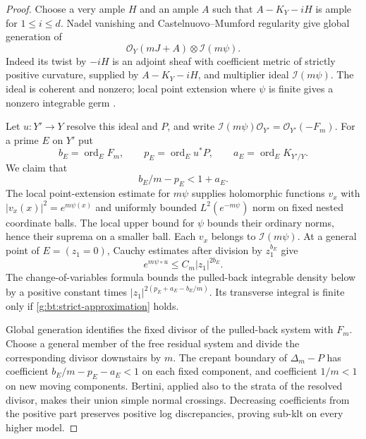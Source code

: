 \begin{proof}
Choose a very ample $H$ and an ample $A$ such that $A-K_Y-iH$ is ample for
$1\leq i\leq d$.  Nadel vanishing and Castelnuovo--Mumford regularity give
global generation of
\[
       \mathcal O_Y(mJ+A)\otimes\mathcal I(m\psi).
\]
Indeed its twist by $-iH$ is an adjoint sheaf with coefficient metric of
strictly positive curvature, supplied by $A-K_Y-iH$, and multiplier ideal
$\mathcal I(m\psi)$.  The ideal is coherent and nonzero; local point
extension where $\psi$ is finite gives a nonzero integrable germ
\cite{Nadel,OhsawaTakegoshi,raDemailly}.

Let $u:Y'\to Y$ resolve this ideal and $P$, and write
$\mathcal I(m\psi)\mathcal O_{Y'}=\mathcal O_{Y'}(-F_m)$.
For a prime $E$ on $Y'$ put
\[
 b_E=\operatorname{ord}_E F_m,\qquad
 p_E=\operatorname{ord}_E u^*P,\qquad
 a_E=\operatorname{ord}_E K_{Y'/Y}.
\]
We claim that
\begin{equation}\label{g:bt:strict-approximation}
                         b_E/m-p_E<1+a_E.
\end{equation}
The local point-extension estimate for $m\psi$ supplies holomorphic
functions $v_x$ with $|v_x(x)|^2=e^{m\psi(x)}$ and uniformly bounded
$L^2(e^{-m\psi})$ norm on fixed nested coordinate balls.  The local upper
bound for $\psi$ bounds their ordinary norms, hence their suprema on a
smaller ball.  Each $v_x$ belongs to $\mathcal I(m\psi)$.  At a general
point of $E=(z_1=0)$, Cauchy estimates after division by $z_1^{b_E}$ give
\[
               e^{m\psi\circ u}\leq C_m|z_1|^{2b_E}.
\]
The change-of-variables formula bounds the pulled-back integrable density
below by a positive constant times $|z_1|^{2(p_E+a_E-b_E/m)}$.
Its transverse integral is finite only if
\eqref{g:bt:strict-approximation} holds.

Global generation identifies the fixed divisor of the pulled-back
system with $F_m$.  Choose a general member of the free residual system
and divide the corresponding divisor downstairs by $m$.  The crepant
boundary of $\Delta_m-P$ has coefficient $b_E/m-p_E-a_E<1$ on each fixed
component, and coefficient $1/m<1$ on new moving components.  Bertini,
applied also to the strata of the resolved divisor, makes their union
simple normal crossings.  Decreasing coefficients from the positive
part preserves positive log discrepancies, proving sub-klt on every
higher model.


\end{proof}
